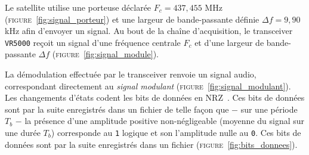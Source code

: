\documentclass[twocolumn,pre,floats,aps,amsmath,amssymb]{revtex4}
\begin{document}
Le satellite utilise une porteuse d\'eclar\'ee $F_c = 437,455$ MHz (\textsc{figure}~\ref{fig:signal_porteur}) et une largeur de bande-passante d\'efinie $\Delta f = 9,90$ kHz afin d'envoyer un signal. Au bout de la cha\^ine d'acquisition, le transceiver \texttt{VR5000} re\c{c}oit un signal d'une fr\'equence centrale $F_c$ et d'une largeur de bande-passante $\Delta f$ (\textsc{figure}~\ref{fig:signal_module}).

La d\'emodulation effectu\'ee par le transceiver renvoie un signal audio, correspondant directement au \textit{signal modulant} (\textsc{figure}~\ref{fig:signal_modulant}). Les changements d'\'etats codent les bits de donn\'ees en NRZ~\cite{nrz_gorry}. Ces bits de donn\'ees sont par la suite enregistr\'es dans un fichier de telle fa\c{c}on que $-$ sur une p\'eriode $T_b$ $-$ la pr\'esence d'une amplitude positive non-n\'egligeable (moyenne du signal sur une dur\'ee $T_b$) corresponde au \texttt{1} logique et son l'amplitude nulle au \texttt{0}. Ces bits de donn\'ees sont par la suite enregistr\'es dans un fichier (\textsc{figure}~\ref{fig:bits_donnees}).

\end{document}
